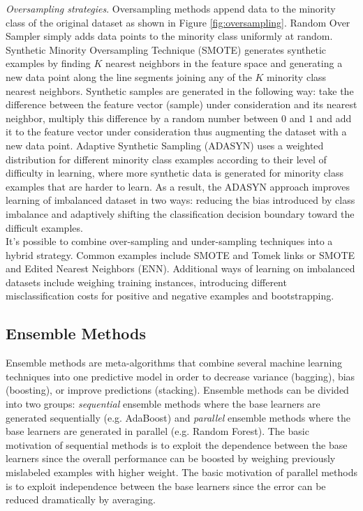 \textit{Oversampling strategies}. Oversampling methods append data to the minority class of the original dataset as shown in Figure \ref{fig:oversampling}. Random Over Sampler simply adds data points to the minority class uniformly at random. Synthetic Minority Oversampling Technique (SMOTE) generates synthetic examples by finding $K$ nearest neighbors in the feature space and generating a new data point along the line segments joining any of the $K$ minority class nearest neighbors. Synthetic samples are generated in the following way: take the difference between the feature vector (sample) under consideration and its nearest neighbor, multiply this difference by a random number between $0$ and $1$ and add it to the feature vector under consideration thus augmenting the dataset with a new data point. Adaptive Synthetic Sampling (ADASYN) uses a weighted distribution for different minority class examples according to their level of difficulty in learning, where more synthetic data is generated for minority class examples that are harder to learn. As a result, the ADASYN approach improves learning of imbalanced dataset in two ways: reducing the bias introduced by class imbalance and adaptively shifting the classification decision boundary toward the difficult examples.\\ 

It's possible to combine over-sampling and under-sampling techniques into a hybrid strategy. Common examples include SMOTE and Tomek links or SMOTE and Edited Nearest Neighbors (ENN). Additional ways of learning on imbalanced datasets include weighing training instances, introducing different misclassification costs for positive and negative examples and bootstrapping. 


\subsection{Ensemble Methods}

Ensemble methods are meta-algorithms that combine several machine learning techniques into one predictive model in order to decrease variance (bagging), bias (boosting), or improve predictions (stacking). Ensemble methods can be divided into two groups: \textit{sequential} ensemble methods where the base learners are generated sequentially (e.g. AdaBoost) and \textit{parallel} ensemble methods where the base learners are generated in parallel (e.g. Random Forest). The basic motivation of sequential methods is to exploit the dependence between the base learners since the overall performance can be boosted by weighing previously mislabeled examples with higher weight.  The basic motivation of parallel methods is to exploit independence between the base learners since the error can be reduced dramatically by averaging.\\  

